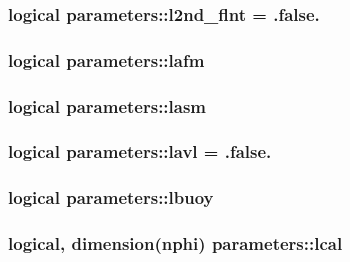 \hypertarget{classparameters_a33714dd59ea2866514d6ba30877c0ae6}{
\subsubsection[{l2nd\-\_\-flnt}]{\setlength{\rightskip}{0pt plus 5cm}logical parameters\-::l2nd\-\_\-flnt = .false.}}\label{classparameters_a33714dd59ea2866514d6ba30877c0ae6}
\hypertarget{classparameters_ad19a7858d6ee32ee981bbcf0f1c15277}{
\subsubsection[{lafm}]{\setlength{\rightskip}{0pt plus 5cm}logical parameters\-::lafm}}\label{classparameters_ad19a7858d6ee32ee981bbcf0f1c15277}
\hypertarget{classparameters_a000fbbafc058baa162d9b5d6451d5527}{
\subsubsection[{lasm}]{\setlength{\rightskip}{0pt plus 5cm}logical parameters\-::lasm}}\label{classparameters_a000fbbafc058baa162d9b5d6451d5527}
\hypertarget{classparameters_a735b36c63dfe2cda2cf67cb65a4a4e4c}{
\subsubsection[{lavl}]{\setlength{\rightskip}{0pt plus 5cm}logical parameters\-::lavl = .false.}}\label{classparameters_a735b36c63dfe2cda2cf67cb65a4a4e4c}
\hypertarget{classparameters_a03390dcf4125f0279a2337ce864980e7}{
\subsubsection[{lbuoy}]{\setlength{\rightskip}{0pt plus 5cm}logical parameters\-::lbuoy}}\label{classparameters_a03390dcf4125f0279a2337ce864980e7}
\hypertarget{classparameters_acd72f68b40a546e800f7055da71696c9}{
\subsubsection[{lcal}]{\setlength{\rightskip}{0pt plus 5cm}logical, dimension({\bf nphi}) parameters\-::lcal}}\label{classparameters_acd72f68b40a546e800f7055da71696c9}
